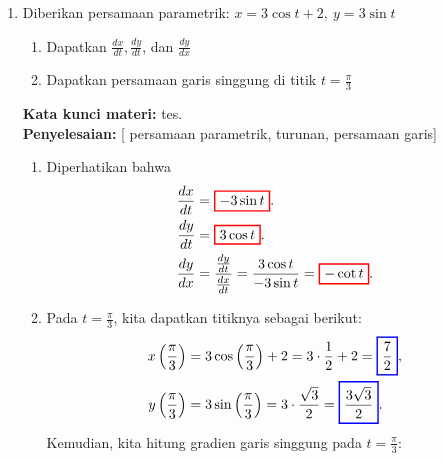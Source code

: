 \documentclass[10pt,openany,a4paper]{article}
\theoremstyle{definition}
\theoremstyle{definition}
\theoremstyle{plain}
\newenvironment{jawab}[2][tes]{
\textbf{Kata kunci materi:} #1.\\
\textbf{Penyelesaian:} #2
}{}
\newenvironment{jawaban}[2][tes]{
\colorlet{oldcolor}{.}
        \color{red}
        \setlength{\fboxrule}{1pt}\boxed{\color{oldcolor}#2}\color{oldcolor}.
}{}
\begin{document}
\begin{enumerate}
        \item[4.] Diberikan persamaan parametrik: $x=3\cos t+2, ~y=3\sin t$
        \begin{enumerate}
            \item Dapatkan $\frac{dx}{dt},\frac{dy}{dt}$, dan $\frac{dy}{dx}$
            \item Dapatkan persamaan garis singgung di titik $t=\frac{\pi}{3}$
        \end{enumerate}
        \begin{jawab}
            [persamaan parametrik, turunan, persamaan garis]
            {
                \begin{enumerate}
                    \item Diperhatikan bahwa 
                    \begin{align*}
                        \frac{dx}{dt} &= 
                        \begin{jawaban}
                             {-3\sin t}
                        \end{jawaban} \\
                        \frac{dy}{dt} &= \begin{jawaban}
                            {3\cos t}
                        \end{jawaban} \\
                        \frac{dy}{dx} &= \frac{\frac{dy}{dt}}{\frac{dx}{dt}} = \frac{3\cos t}{-3\sin t} = \begin{jawaban}
                            {- \cot t}
                        \end{jawaban}
                    \end{align*}
                    \item Pada $t=\frac{\pi}{3}$, kita dapatkan titiknya sebagai berikut:
                    \begin{align*}
                        x\left(\frac{\pi}{3}\right) &= 3\cos\left(\frac{\pi}{3}\right) + 2 = 3\cdot\frac{1}{2} + 2 = 
                        \colorlet{oldcolor}{.}
        \color{blue}
        \setlength{\fboxrule}{1pt} \boxed{\color{oldcolor}\frac{7}{2}}\color{oldcolor}, \\
                        y\left(\frac{\pi}{3}\right) &= 3\sin\left(\frac{\pi}{3}\right) = 3\cdot\frac{\sqrt{3}}{2} = \colorlet{oldcolor}{.}
        \color{blue}
        \setlength{\fboxrule}{1pt} \boxed{\color{oldcolor}\frac{3\sqrt{3}}{2}}\color{oldcolor}.
                    \end{align*}
                    Kemudian, kita hitung gradien garis singgung pada $t=\frac{\pi}{3}$:

\end{enumerate}}
\end{jawab}
\end{enumerate}
\end{document}
